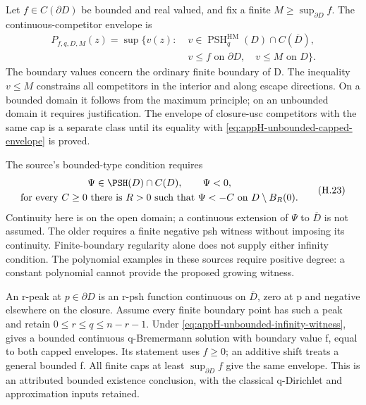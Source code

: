 Let \(f\in C(\partial D)\) be bounded and real valued, and fix a finite
\(M\geq\sup_{\partial D}f\). The continuous-competitor envelope is
\[
\begin{split}
 P_{f,q,D,M}(z)=\sup\{v(z):\;&v\in
      \operatorname{PSH}^{\mathrm{HM}}_q(D)\cap C(\overline D),\\
     &v\leq f\text{ on }\partial D,\quad v\leq M\text{ on }D\}.
\end{split}
\tag{H.22}\label{eq:appH-unbounded-capped-envelope}
\]
The boundary values concern the ordinary finite boundary of D.
The inequality \(v\leq M\) constrains all competitors in the interior
and along escape directions. On a bounded domain it follows from the
maximum principle; on an unbounded domain it requires justification.
The envelope of closure-usc competitors with the same cap is a
separate class until its equality with
\eqref{eq:appH-unbounded-capped-envelope} is proved.

The source's bounded-type condition requires
\[
\begin{gathered}
 \Psi\in\PSH(D)\cap C(D),\qquad \Psi<0,\\
 \text{for every }C\geq0\text{ there is }R>0\text{ such that }
      \Psi<-C\text{ on }D\setminus B_R(0).
\end{gathered}
\tag{H.23}\label{eq:appH-unbounded-infinity-witness}
\]
Continuity here is on the open domain; a continuous extension of \(\Psi\)
to \(\overline D\) is not assumed. The older
\cite[Definition~2.6; printed p.~1389]{NguyenHung08UnboundedPublished}
requires a finite negative psh witness without imposing its continuity.
Finite-boundary regularity alone does not supply either infinity condition.
The polynomial examples in these sources require positive degree:
a constant polynomial cannot provide the proposed growing witness.

An r-peak at \(p\in\partial D\) is an r-psh function continuous on
\(\overline D\), zero at p and negative elsewhere on the closure.
Assume every finite boundary point has such a peak and retain
\(0\leq r\leq q\leq n-r-1\). Under
\eqref{eq:appH-unbounded-infinity-witness},
\cite[Theorem~4.19(1)--(4) and Remark~4.20; actual pp.~10--12]{Pawlaschyk26UnboundedPerronV1}
gives a bounded continuous q-Bremermann solution with boundary value f,
equal to both capped envelopes. Its statement uses \(f\geq0\);
an additive shift treats a general bounded f. All finite caps at least
\(\sup_{\partial D}f\) give the same envelope. This is an attributed
bounded existence conclusion, with the classical q-Dirichlet and
approximation inputs retained.

